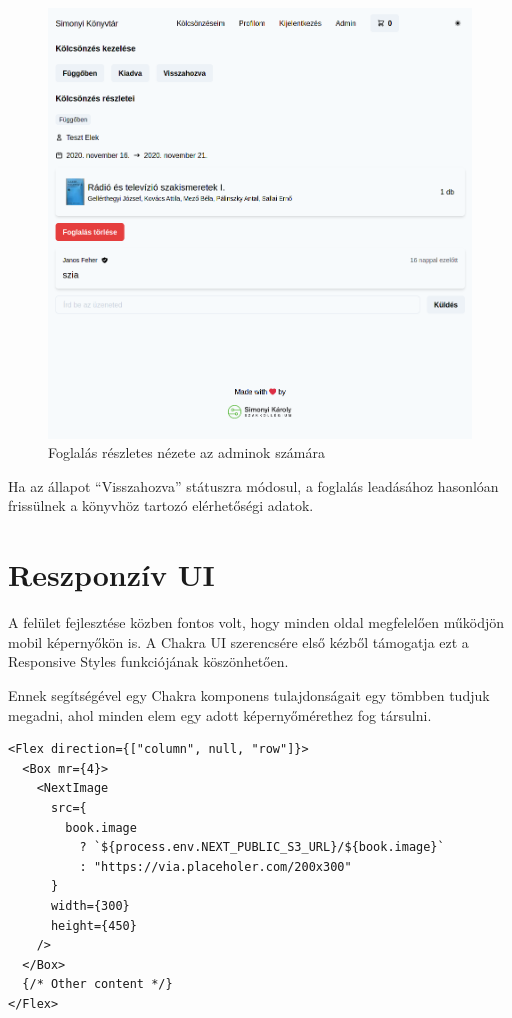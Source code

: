 \begin{figure}[!ht]
  \centering
  \includegraphics[width=150mm, keepaspectratio]{figures/order-admin-detail.png}
  \caption{Foglalás részletes nézete az adminok számára}
  \label{fig:OrderAdminDetail}
\end{figure}

Ha az állapot ``Visszahozva'' státuszra módosul, a foglalás leadásához hasonlóan frissülnek a könyvhöz tartozó elérhetőségi adatok.

\section{Reszponzív UI}

A felület fejlesztése közben fontos volt, hogy minden oldal megfelelően működjön mobil képernyőkön is.
A Chakra UI szerencsére első kézből támogatja ezt a Responsive Styles funkciójának köszönhetően.

Ennek segítségével egy Chakra komponens tulajdonságait egy tömbben tudjuk megadni, ahol minden elem egy adott képernyőmérethez
fog társulni.

\begin{lstlisting}[caption=Chakra UI Responsive Styles használata]
<Flex direction={["column", null, "row"]}>
  <Box mr={4}>
    <NextImage
      src={
        book.image
          ? `${process.env.NEXT_PUBLIC_S3_URL}/${book.image}`
          : "https://via.placeholer.com/200x300"
      }
      width={300}
      height={450}
    />
  </Box>
  {/* Other content */}
</Flex>
\end{lstlisting}

